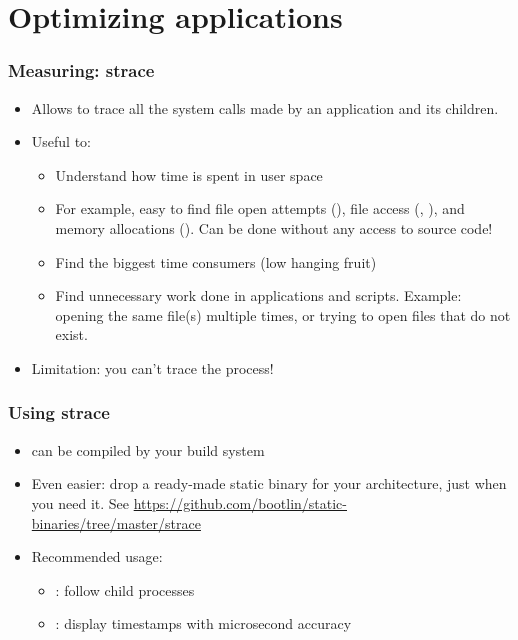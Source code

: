 \section{Optimizing applications}

\begin{frame}
\frametitle{Measuring: strace}
\begin{itemize}
	\item Allows to trace all the system calls made by an
              application and its children.
	\item Useful to:
	\begin{itemize}
		\item Understand how time is spent in user space
		\item For example, easy to find file open attempts (),
		      file access (, ), and
		      memory allocations (). Can be done
		      without any access to source code!
		\item Find the biggest time consumers
		      (low hanging fruit)
		\item Find unnecessary work done in applications
		      and scripts. Example: opening the same file(s)
		      multiple times, or trying to open files that
		      do not exist.
	\end{itemize}
	\item Limitation: you can't trace the  process!
\end{itemize}
\end{frame}

\begin{frame}
\frametitle{Using strace}
\begin{itemize}
	\item {} can be compiled by your build system
	\item Even easier: drop a ready-made static binary for your
	      architecture, just when you need it. See
	      \url{https://github.com/bootlin/static-binaries/tree/master/strace}
	\item Recommended usage: \\
        \begin{itemize}
	      \item {}: follow child processes
	      \item {}: display timestamps with microsecond accuracy
	\end{itemize}
\end{itemize}
\end{frame}


